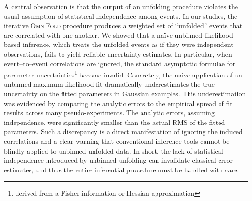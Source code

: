     A central observation is that the output of an unfolding procedure violates the usual assumption of statistical independence among events.
    In our studies, the iterative \textsc{OmniFold} procedure produces a weighted set of “unfolded” events that are correlated with one another.
    We showed that a naïve unbinned likelihood--based inference, which treats the unfolded events as if they were independent observations, fails to yield reliable uncertainty estimates.
    In particular, when event--to--event correlations are ignored, the standard asymptotic formulae for parameter uncertainties\footnote{derived from a Fisher information or Hessian approximation} become invalid.
    Concretely, the naive application of an unbinned maximum likelihood fit dramatically underestimates the true uncertainty on the fitted parameters in Gaussian examples.
    This underestimation was evidenced by comparing the analytic errors to the empirical spread of fit results across many pseudo-experiments.
    The analytic errors, assuming independence, were significantly smaller than the actual RMS of the fitted parameters.
    Such a discrepancy is a direct manifestation of ignoring the induced correlations and a clear warning that conventional inference tools cannot be blindly applied to unbinned unfolded data.
    In short, the lack of statistical independence introduced by unbinned unfolding can invalidate classical error estimates, and thus the entire inferential procedure must be handled with care.

